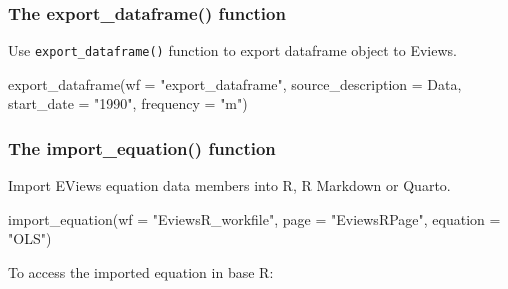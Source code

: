 \documentclass[
  letterpaper,
  DIV=11,
  numbers=noendperiod]{scrartcl}
\newenvironment{Shaded}{\begin{snugshade}}{\end{snugshade}}
\newcommand{\AttributeTok}[1]{\textcolor[rgb]{0.40,0.45,0.13}{#1}}
\newcommand{\FunctionTok}[1]{\textcolor[rgb]{0.28,0.35,0.67}{#1}}
\newcommand{\NormalTok}[1]{\textcolor[rgb]{0.00,0.23,0.31}{#1}}
\newcommand{\StringTok}[1]{\textcolor[rgb]{0.13,0.47,0.30}{#1}}
\begin{document}
\begin{figure}

\end{figure}

\hypertarget{the-export_dataframe-function}{%
\subsubsection{The export\_dataframe()
function}\label{the-export_dataframe-function}}

Use \texttt{export\_dataframe()} function to export dataframe object to
Eviews.

\begin{Shaded}
\begin{Highlighting}[]
\FunctionTok{export\_dataframe}\NormalTok{(}\AttributeTok{wf =} \StringTok{"export\_dataframe"}\NormalTok{, }\AttributeTok{source\_description =}\NormalTok{ Data,}
    \AttributeTok{start\_date =} \StringTok{"1990"}\NormalTok{, }\AttributeTok{frequency =} \StringTok{"m"}\NormalTok{)}
\end{Highlighting}
\end{Shaded}

\begin{figure}

\end{figure}

\hypertarget{the-import_equation-function}{%
\subsubsection{The import\_equation()
function}\label{the-import_equation-function}}

Import EViews equation data members into R, R Markdown or Quarto.

\begin{Shaded}
\begin{Highlighting}[]
\FunctionTok{import\_equation}\NormalTok{(}\AttributeTok{wf =} \StringTok{"EviewsR\_workfile"}\NormalTok{, }\AttributeTok{page =} \StringTok{"EviewsRPage"}\NormalTok{,}
    \AttributeTok{equation =} \StringTok{"OLS"}\NormalTok{)}
\end{Highlighting}
\end{Shaded}

\begin{figure}

\end{figure}

To access the imported equation in base R:
\end{document}
